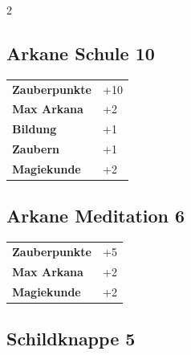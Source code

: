 \begin{multicols}{2}
\begin{tcolorbox}

\end{tcolorbox}

\begin{tcolorbox}
    \subsection*{Arkane Schule \hfill \small{10 }}
    \tcblower




\begin{tabular}{@{}ll@{}}
    \textbf{Zauberpunkte} & +10\\
    \textbf{Max Arkana} & +2\\
    \textbf{Bildung} & +1\\
    \textbf{Zaubern} & +1\\
    \textbf{Magiekunde} & +2\\
\end{tabular}


\end{tcolorbox}

\begin{tcolorbox}
    \subsection*{Arkane Meditation \hfill \small{6 }}
    \tcblower




\begin{tabular}{@{}ll@{}}
    \textbf{Zauberpunkte} & +5\\
    \textbf{Max Arkana} & +2\\
    \textbf{Magiekunde} & +2\\
\end{tabular}


\end{tcolorbox}

\begin{tcolorbox}
    \subsection*{Schildknappe \hfill \small{5 }}
    \tcblower



\end{tcolorbox}
\end{multicols}
